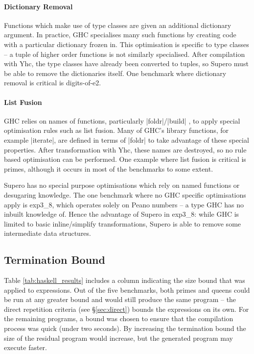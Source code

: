 \documentclass{llncs}
\begin{document}
\paragraph{Dictionary Removal} Functions which make use of type classes are given an additional dictionary argument. In practice, GHC specialises many such functions by creating code with a particular dictionary frozen in. This optimisation is specific to type classes -- a tuple of higher order functions is not similarly specialised. After compilation with Yhc, the type classes have already been converted to tuples, so Supero must be able to remove the dictionaries itself. One benchmark where dictionary removal is critical is digits-of-e2.

\paragraph{List Fusion} GHC relies on names of functions, particularly |foldr|/|build| \cite{spj:rules}, to apply special optimisation rules such as list fusion. Many of GHC's library functions, for example |iterate|, are defined in terms of |foldr| to take advantage of these special properties. After transformation with Yhc, these names are destroyed, so no rule based optimisation can be performed. One example where list fusion is critical is primes, although it occurs in most of the benchmarks to some extent.

Supero has no special purpose optimisations which rely on named functions or desugaring knowledge. The one benchmark where no GHC specific optimisations apply is exp3\_8, which operates solely on Peano numbers -- a type GHC has no inbuilt knowledge of. Hence the advantage of Supero in exp3\_8: while GHC is limited to basic inline/simplify transformations, Supero is able to remove some intermediate data structures.

\subsection{Termination Bound}
\label{sec:results_bound}

Table \ref{tab:haskell_results} includes a column indicating the size bound that was applied to expressions. Out of the five benchmarks, both primes and queens could be run at any greater bound and would still produce the same program -- the direct repetition criteria (see \S\ref{sec:direct}) bounds the expressions on its own. For the remaining programs, a bound was chosen to ensure that the compilation process was quick (under two seconds). By increasing the termination bound the size of the residual program would increase, but the generated program may execute faster.
\end{document}
